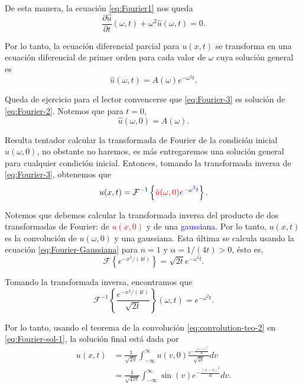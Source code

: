 \begin{ejemplo}
De esta manera, la ecuación \eqref{eq:Fourier1} nos queda
\begin{equation}
    \frac{\partial \hat{u}}{\partial t}(\omega, t) + \omega^2 \hat{u}(\omega,t) = 0. \label{eq:Fourier-2}
\end{equation}

Por lo tanto, la ecuación diferencial parcial para $u(x,t)$ se transforma en una ecuación diferencial de primer orden para cada valor de $\omega$ cuya solución general es
\begin{equation}
    \hat{u}(\omega,t) = A(\omega) e^{-\omega^2 t}. \label{eq:Fourier-3}
\end{equation}

Queda de ejercicio para el lector convencerse que \eqref{eq:Fourier-3} es solución de \eqref{eq:Fourier-2}. Notemos que para $t = 0$,
\begin{equation}
    \hat{u}(\omega,0) = A(\omega).
\end{equation}

Resulta tentador calcular la transformada de Fourier de la condición inicial $\hat{u}(\omega,0)$, no obstante no haremos, es más entregaremos una solución general para cualquier condición inicial. Entonces, tomando la transformada inversa de \eqref{eq:Fourier-3}, obtenemos que
\begin{equation}
    u(x,t) = \mathcal{F}^{-1}\left\{\textcolor{red}{\hat{u}(\omega,0)} \textcolor{blue}{e^{-\omega^2t}}\right\}. \label{eq:Fourier-sol-1}
\end{equation}

Notemos que debemos calcular la transformada inversa del producto de dos transformadas de Fourier: de \textcolor{red}{$u(x,0)$} y de una \textcolor{blue}{gaussiana}. Por lo tanto, $u(x,t)$ es la convolución de $u(\omega,0)$ y una gaussiana. Esta última se calcula usando la ecuación \eqref{eq:Fourier-Gaussiana} para $n = 1$ y $\alpha = 1/(4t) > 0$, ésto es,
\begin{equation}
    \mathcal{F}\left\{ e^{-x^2/(4t)}\right\} = \sqrt{2t} e^{-\omega^2 t}.
\end{equation}

Tomando la transformada inversa, encontramos que
\begin{equation}
    \mathcal{F}^{-1}\left\{\frac{e^{-x^2/(4t)}}{\sqrt{2t}}\right\}(\omega,t) = e^{-\omega^2t}.
\end{equation}

Por lo tanto, usando el teorema de la convolución \eqref{eq:convolution-teo-2} en \eqref{eq:Fourier-sol-1}, la solución final está dada por
\begin{align}
    u(x,t) &= \frac{1}{\sqrt{2\pi}} \int_{-\infty}^{\infty} u(v,0) \frac{e^{-\frac{(x-v)^2}{4t}}}{\sqrt{2t}} dv \nonumber\\
    &= \frac{1}{\sqrt{4\pi t}} \int_{-\infty}^{\infty} \sin(v) e^{-\frac{(x-v)^2}{4t}} dv.
\end{align}
\end{ejemplo}

